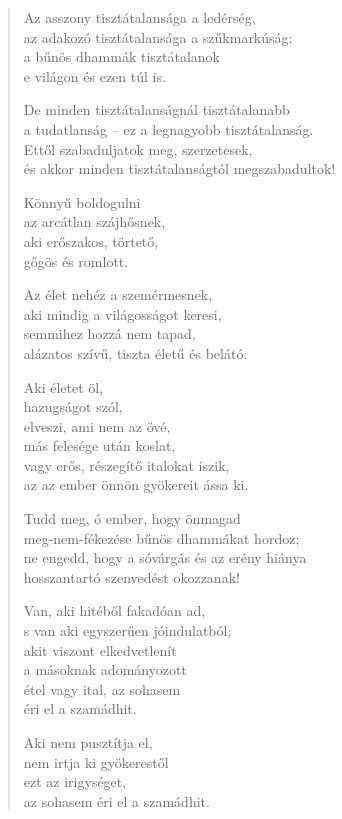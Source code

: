 \begin{verse}
 Az asszony tisztátalansága a ledérség,\\
az adakozó tisztátalansága a szűkmarkúság;\\
a bűnös dhammák tisztátalanok\\
e világon és ezen túl is.

 De minden tisztátalanságnál tisztátalanabb\\
a tudatlanság – ez a legnagyobb tisztátalanság.\\
Ettől szabaduljatok meg, szerzetesek,\\
és akkor minden tisztátalanságtól megszabadultok!

\newpage

 Könnyű boldogulni\\
az arcátlan szájhősnek,\\
aki erőszakos, törtető,\\
gőgös és romlott.

 Az élet nehéz a szemérmesnek,\\
aki mindig a világosságot keresi,\\
semmihez hozzá nem tapad,\\
alázatos szívű, tiszta életű és belátó.

 Aki életet öl,\\
hazugságot szól,\\
elveszi, ami nem az övé,\\
más felesége után koslat,\\
vagy erős, részegítő italokat iszik,\\
az az ember önnön gyökereit ássa ki.

 Tudd meg, ó ember, hogy önmagad\\
meg-nem-fékezése bűnös dhammákat hordoz;\\
ne engedd, hogy a sóvárgás és az erény hiánya\\
hosszantartó szenvedést okozzanak!

 Van, aki hitéből fakadóan ad,\\
s van aki egyszerűen jóindulatból;\\
akit viszont elkedvetlenít\\
a másoknak adományozott\\
étel vagy ital, az sohasem\\
éri el a szamádhit.

\newpage

 Aki nem pusztítja el,\\
nem irtja ki gyökerestől\\
ezt az irigységet,\\
az sohasem éri el a szamádhit.


\end{verse}
